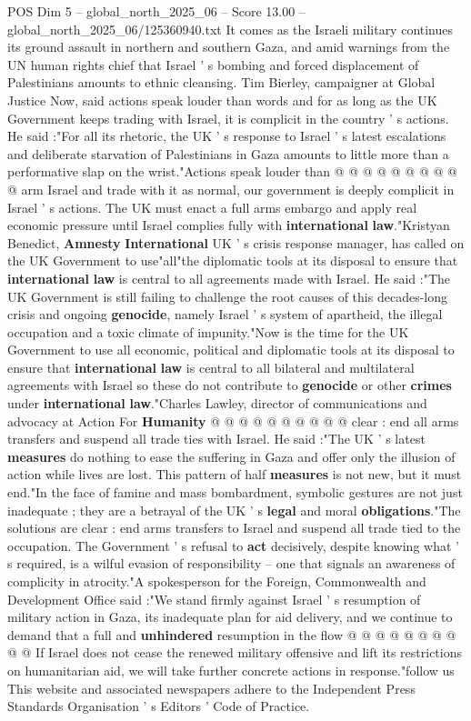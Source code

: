 \begin{textsample}{POS Dim 5 – global\_north\_2025\_06 – Score 13.00 – global\_north\_2025\_06/125360940.txt}
It comes as the Israeli military continues its ground assault in northern and southern Gaza, and amid warnings from the UN human rights chief that Israel ' s bombing and forced displacement of Palestinians amounts to ethnic cleansing.
Tim Bierley, campaigner at Global Justice Now, said actions speak louder than words and for as long as the UK Government keeps trading with Israel, it is complicit in the country ' s actions.
He said :"For all its rhetoric, the UK ' s response to Israel ' s latest escalations and deliberate starvation of Palestinians in Gaza amounts to little more than a performative slap on the wrist."Actions speak louder than @ @ @ @ @ @ @ @ @ @ arm Israel and trade with it as normal, our government is deeply complicit in Israel ' s actions.
The UK must enact a full arms embargo and apply real economic pressure until Israel complies fully with \textbf{international} \textbf{law}."Kristyan Benedict, \textbf{Amnesty} \textbf{International} UK ' s crisis response manager, has called on the UK Government to use"all"the diplomatic tools at its disposal to ensure that \textbf{international} \textbf{law} is central to all agreements made with Israel.
He said :"The UK Government is still failing to challenge the root causes of this decades-long crisis and ongoing \textbf{genocide}, namely Israel ' s system of apartheid, the illegal occupation and a toxic climate of impunity."Now is the time for the UK Government to use all economic, political and diplomatic tools at its disposal to ensure that \textbf{international} \textbf{law} is central to all bilateral and multilateral agreements with Israel so these do not contribute to \textbf{genocide} or other \textbf{crimes} under \textbf{international} \textbf{law}."Charles Lawley, director of communications and advocacy at Action For \textbf{Humanity} @ @ @ @ @ @ @ @ @ @ clear : end all arms transfers and suspend all trade ties with Israel.
He said :"The UK ' s latest \textbf{measures} do nothing to ease the suffering in Gaza and offer only the illusion of action while lives are lost.
This pattern of half \textbf{measures} is not new, but it must end."In the face of famine and mass bombardment, symbolic gestures are not just inadequate ; they are a betrayal of the UK ' s \textbf{legal} and moral \textbf{obligations}."The solutions are clear : end arms transfers to Israel and suspend all trade tied to the occupation.
The Government ' s refusal to \textbf{act} decisively, despite knowing what ' s required, is a wilful evasion of responsibility -- one that signals an awareness of complicity in atrocity."A spokesperson for the Foreign, Commonwealth and Development Office said :"We stand firmly against Israel ' s resumption of military action in Gaza, its inadequate plan for aid delivery, and we continue to demand that a full and \textbf{unhindered} resumption in the flow @ @ @ @ @ @ @ @ @ @ If Israel does not cease the renewed military offensive and lift its restrictions on humanitarian aid, we will take further concrete actions in response."follow us This website and associated newspapers adhere to the Independent Press Standards Organisation ' s Editors ' Code of Practice.

\end{textsample}
